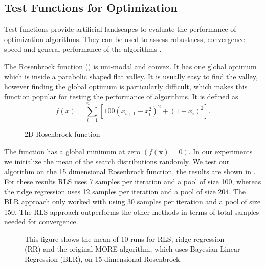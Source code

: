 
\subsection{Test Functions for Optimization}
\label{sec:test_func}
Test functions provide artificial landscapes to evaluate the
performance of optimization algorithms. They can be used to
assess robustness, convergence speed and general performance of the
algorithms \citep{molga2005test}.

The Rosenbrock function () is uni-modal and convex.
It has one global optimum which is inside a parabolic shaped flat valley.
It is usually easy to find the valley,
however finding the global optimum is particularly difficult,
which makes this function popular for testing the performance
of algorithms.
It is defined as 
\begin{equation*}
 f(x) = \sum^{n-1}_{i=1} [100(x_{i+1} - x_i^2)^2 + (1-x_i)^2].
\end{equation*}

\begin{figure}[ht!]
    \centering
    
    \caption{2D Rosenbrock function}
    \label{fig:rosenbrock}
\end{figure}

The function has a global minimum at zero $(f(\mathbf{x}) = 0)$.
In our experiments we initialize the mean of the search distributions
randomly. We test our algorithm on the 15 dimensional
Rosenbrock function, the results are shown in .
For these results RLS uses 7 samples per iteration and a pool
of size 100, whereas the ridge regression uses 12 samples per
iteration and a pool
of size 204. The BLR approach only worked with using 30 samples
per iteration and a pool of size 150. The RLS approach
outperforms the other methods in terms of total samples needed for
convergence. 
\begin{figure}[ht!]
     \centering
     
     \hspace{1cm}                       
     \caption{
       This figure shows the mean of 10 runs for RLS, ridge regression (RR)
       and the original MORE algorithm, which uses
       Bayesian Linear Regression (BLR),
       on 15 dimensional Rosenbrock.
     }
     \label{fig:rosen_result}  
\end{figure}

